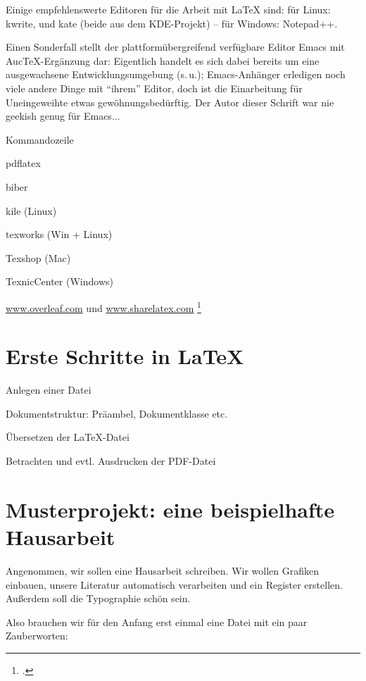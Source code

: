 Einige empfehlenswerte Editoren für die Arbeit mit \LaTeX{} sind:
für Linux: kwrite,  und kate (beide aus dem KDE-Projekt) --
für Windows: Notepad++.

Einen Sonderfall stellt der plattformübergreifend verfügbare Editor Emacs mit AucTeX-Ergänzung
dar: Eigentlich handelt es sich dabei bereits um eine ausgewachsene Entwicklungsumgebung (s.\,u.);
Emacs-Anhänger erledigen noch viele andere Dinge mit \enquote{ihrem} Editor, doch ist die 
Einarbeitung für Uneingeweihte etwas gewöhnungsbedürftig.
Der Autor dieser Schrift war nie geekish genug für Emacs...

Kommandozeile

pdflatex

biber



kile (Linux)

texworks (Win + Linux)

Texshop (Mac)

TexnicCenter (Windows)


\url{www.overleaf.com}  und \url{www.sharelatex.com} 
\footcite{meyer:dtk2015/1}



\section{Erste Schritte in \LaTeX}

Anlegen einer Datei

Dokumentstruktur: Präambel, Dokumentklasse etc.

Übersetzen der \LaTeX{}-Datei

Betrachten und evtl. Ausdrucken der PDF-Datei


\section{Musterprojekt: eine beispielhafte Hausarbeit}

Angenommen, wir sollen eine Hausarbeit schreiben.
Wir wollen Grafiken einbauen, unsere Literatur automatisch verarbeiten und ein Register erstellen.
Außerdem soll die Typographie schön sein.

Also brauchen wir für den Anfang erst einmal eine Datei mit ein paar Zauberworten:



